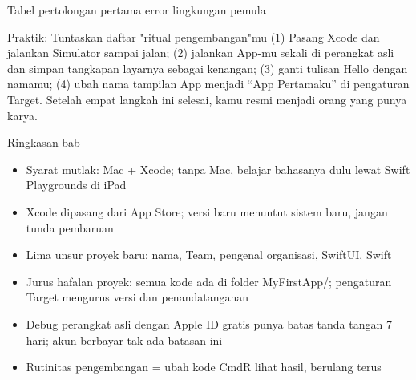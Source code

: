 \begin{center}\small\color{gray}Tabel pertolongan pertama error lingkungan pemula\end{center}

\begin{tcbpractice}{Praktik: Tuntaskan daftar "ritual pengembangan"mu}
(1) Pasang Xcode dan jalankan Simulator sampai jalan; (2) jalankan App-mu sekali di perangkat asli dan simpan tangkapan layarnya sebagai kenangan; (3) ganti tulisan Hello dengan namamu; (4) ubah nama tampilan App menjadi “App Pertamaku” di pengaturan Target. Setelah empat langkah ini selesai, kamu resmi menjadi orang yang punya karya.

\end{tcbpractice}

\begin{tcbsummary}{Ringkasan bab}
\begin{itemize}
  \item Syarat mutlak: Mac + Xcode; tanpa Mac, belajar bahasanya dulu lewat Swift Playgrounds di iPad
  \item Xcode dipasang dari App Store; versi baru menuntut sistem baru, jangan tunda pembaruan
  \item Lima unsur proyek baru: nama, Team, pengenal organisasi, SwiftUI, Swift
  \item Jurus hafalan proyek: semua kode ada di folder MyFirstApp/; pengaturan Target mengurus versi dan penandatanganan
  \item Debug perangkat asli dengan Apple ID gratis punya batas tanda tangan 7 hari; akun berbayar tak ada batasan ini
  \item Rutinitas pengembangan = ubah kode CmdR lihat hasil, berulang terus
\end{itemize}

\end{tcbsummary}
